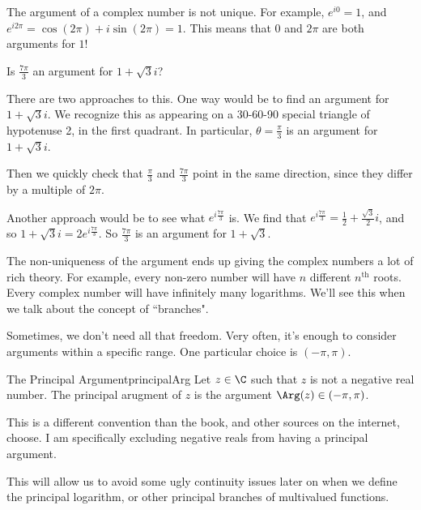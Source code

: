 The argument of a complex number is not unique. For example, $e^{i0} = 1$, and $e^{i2\pi} = \cos(2\pi) + i\sin(2\pi) = 1$. This means that $0$ and $2\pi$ are both arguments for $1$!

\begin{ex}{}{} Is $\frac{7\pi}{3}$ an argument for $1 + \sqrt{3}i$?

There are two approaches to this. One way would be to find an argument for $1 + \sqrt{3}i$. We recognize this as appearing on a 30-60-90 special triangle of hypotenuse 2, in the first quadrant. In particular, $\theta = \frac{\pi}{3}$ is an argument for $1 + \sqrt{3}i$.

Then we quickly check that $\frac{\pi}{3}$ and $\frac{7\pi}{3}$ point in the same direction, since they differ by a multiple of $2\pi$.

\vspace{10pt}

Another approach would be to see what $e^{i\frac{7\pi}{3}}$ is. We find that $e^{i\frac{7\pi}{3}} = \frac{1}{2} + \frac{\sqrt{3}}{2}i$, and so $1 + \sqrt{3}i = 2e^{i\frac{7\pi}{3}}$. So $\frac{7\pi}{3}$ is an argument for $1 + \sqrt{3}$.

\end{ex}

The non-uniqueness of the argument ends up giving the complex numbers a lot of rich theory. For example, every non-zero number will have $n$ different $n^{\text{th}}$ roots. Every complex number will have infinitely many logarithms. We'll see this when we talk about the concept of ``branches".

Sometimes, we don't need all that freedom. Very often, it's enough to consider arguments within a specific range. One particular choice is $(-\pi,\pi)$.

\begin{defbo}{The Principal Argument}{principalArg} 
Let $z\in \C$ such that $z$ is not a negative real number. The principal arugment of $z$ is the argument $\Arg(z) \in (-\pi,\pi)$.
\end{defbo}

\begin{note} This is a different convention than the book, and other sources on the internet, choose. I am specifically excluding negative reals from having a principal argument.

This will allow us to avoid some ugly continuity issues later on when we define the principal logarithm, or other principal branches of multivalued functions.\end{note}



